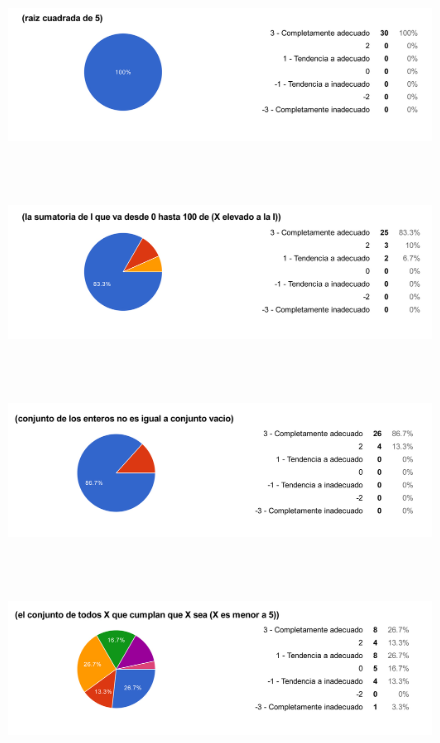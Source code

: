 \begin{figure}[H]
\centering
	\includegraphics[width=15cm, height=4.74cm]{Figures/hjudgement/r16}
	\caption[]{}
\label{fig:parsed_corpus}
\end{figure}

\begin{figure}[H]
\centering
	\includegraphics[width=15cm, height=4.74cm]{Figures/hjudgement/r17}
	\caption[]{}
\label{fig:parsed_corpus}
\end{figure}

\begin{figure}[H]
\centering
	\includegraphics[width=15cm, height=4.74cm]{Figures/hjudgement/r18}
	\caption[]{}
\label{fig:parsed_corpus}
\end{figure}

\begin{figure}[H]
\centering
	\includegraphics[width=15cm, height=4.74cm]{Figures/hjudgement/r19}
	\caption[]{}
\label{fig:parsed_corpus}
\end{figure}

